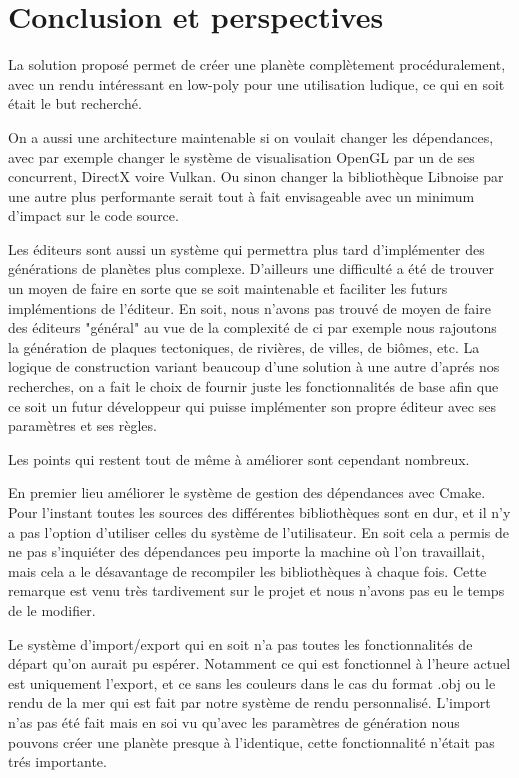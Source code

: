 \documentclass[a4paper]{article}
\begin{document}
\newpage
\section{Conclusion et perspectives}

La solution proposé permet de créer une planète complètement procéduralement, avec un rendu intéressant en low-poly pour une utilisation ludique, ce qui en soit était le but recherché. 

On a aussi une architecture maintenable si on voulait changer les dépendances, avec par exemple changer le système de visualisation OpenGL par un de ses concurrent, DirectX voire Vulkan. Ou sinon changer la bibliothèque Libnoise par une autre plus performante serait tout à fait envisageable avec un minimum d'impact sur le code source.

Les éditeurs sont aussi un système qui permettra plus tard d'implémenter des générations de planètes plus complexe. D'ailleurs une difficulté a été de trouver un moyen de faire en sorte que se soit maintenable et faciliter les futurs implémentions de l'éditeur. En soit, nous n'avons pas trouvé de moyen de faire des éditeurs "général" au vue de la complexité de ci par exemple nous rajoutons la génération de plaques tectoniques, de rivières, de villes, de biômes, etc. La logique de construction variant beaucoup d'une solution à une autre d'aprés nos recherches, on a fait le choix de fournir juste les fonctionnalités de base afin que ce soit un futur développeur qui puisse implémenter son propre éditeur avec ses paramètres et ses règles.

Les points qui restent tout de même à améliorer sont cependant nombreux.

En premier lieu améliorer le système de gestion des dépendances avec Cmake. Pour l'instant toutes les sources des différentes bibliothèques sont en dur, et il n'y a pas l'option d'utiliser celles du  système de l'utilisateur. En soit cela a permis de ne pas s'inquiéter des dépendances peu importe la machine où l'on travaillait, mais cela a le désavantage de recompiler les bibliothèques à chaque fois. Cette remarque est venu très tardivement sur le projet et nous n'avons pas eu le temps de le modifier.

Le système d'import/export qui en soit n'a pas toutes les fonctionnalités de départ qu'on aurait pu espérer. Notamment ce qui est fonctionnel à l'heure actuel est uniquement l'export, et ce sans les couleurs dans le cas du format .obj ou le rendu de la mer qui est fait par notre système de rendu personnalisé. L'import n'as pas été fait mais en soi vu qu'avec les paramètres de génération nous pouvons créer une planète presque à l'identique, cette fonctionnalité n'était pas trés importante.
\end{document}
